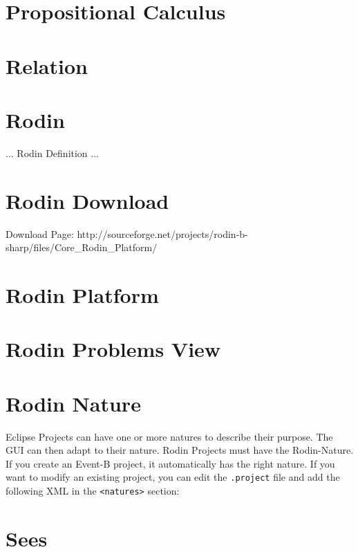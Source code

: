\section{Propositional Calculus}
\label{propositional_calculus}

\section{Relation}
\label{relation}

\section{Rodin}
\label{rodin}

... Rodin Definition ...

\section{Rodin Download}
\label{rodin_download}

Download Page: http://sourceforge.net/projects/rodin-b-sharp/files/Core\_Rodin\_Platform/


\section{Rodin Platform}
\label{rodin_platform}



\section{Rodin Problems View}
\label{rodin_problems_view}


\section{Rodin Nature}
\label{rodin_nature}

Eclipse Projects can have one or more natures to describe their purpose.  The GUI can then adapt to their nature.  Rodin Projects must have the Rodin-Nature.  If you create an Event-B project, it automatically has the right nature.  If you want to modify an existing project, you can edit the \texttt{.project} file and add the following XML in the \texttt{<natures>} section:


\section{Sees}
\label{sees}


